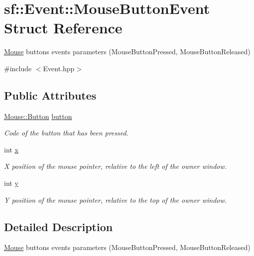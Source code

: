 \hypertarget{structsf_1_1_event_1_1_mouse_button_event}{\section{sf\-:\-:Event\-:\-:Mouse\-Button\-Event Struct Reference}
\label{structsf_1_1_event_1_1_mouse_button_event}
}


\hyperlink{classsf_1_1_mouse}{Mouse} buttons events parameters (Mouse\-Button\-Pressed, Mouse\-Button\-Released)  




{\ttfamily \#include $<$Event.\-hpp$>$}

\subsection*{Public Attributes}
\begin{DoxyCompactItemize}
\item 
\hyperlink{classsf_1_1_mouse_a4fb128be433f9aafe66bc0c605daaa90}{Mouse\-::\-Button} \hyperlink{structsf_1_1_event_1_1_mouse_button_event_a5f53725aa7b647705486eeb95f723024}{button}
\begin{DoxyCompactList}\small\item\em Code of the button that has been pressed. \end{DoxyCompactList}\item 
int \hyperlink{structsf_1_1_event_1_1_mouse_button_event_a49b937b311729174950787781aafcdc7}{x}
\begin{DoxyCompactList}\small\item\em X position of the mouse pointer, relative to the left of the owner window. \end{DoxyCompactList}\item 
int \hyperlink{structsf_1_1_event_1_1_mouse_button_event_aae4735071868d4411d1782bf67619d64}{y}
\begin{DoxyCompactList}\small\item\em Y position of the mouse pointer, relative to the top of the owner window. \end{DoxyCompactList}\end{DoxyCompactItemize}


\subsection{Detailed Description}
\hyperlink{classsf_1_1_mouse}{Mouse} buttons events parameters (Mouse\-Button\-Pressed, Mouse\-Button\-Released) 

